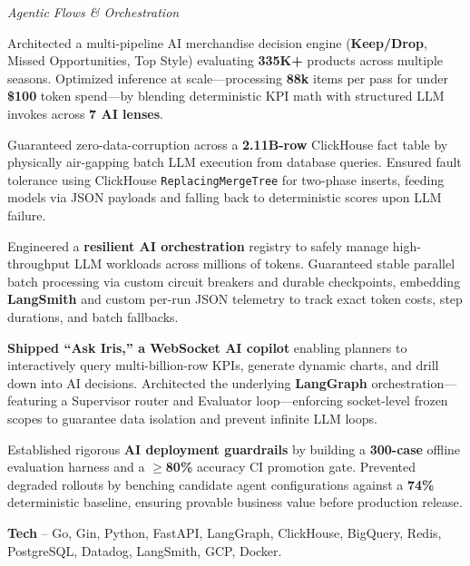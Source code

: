 \textcolor{Project}{\textit{Agentic Flows \& Orchestration}}
\vspace{-0.65ex}
\begin{zitemize}
    \item Architected a multi-pipeline AI merchandise decision engine (\textbf{Keep/Drop}, Missed Opportunities, Top Style) evaluating \textbf{335K+} products across multiple seasons. Optimized inference at scale---processing \textbf{88k} items per pass for under \textbf{\$100} token spend---by blending deterministic KPI math with structured LLM invokes across \textbf{7 AI lenses}.
    \item Guaranteed zero-data-corruption across a \textbf{2.11B-row} ClickHouse fact table by physically air-gapping batch LLM execution from database queries. Ensured fault tolerance using ClickHouse \texttt{ReplacingMergeTree} for two-phase inserts, feeding models via JSON payloads and falling back to deterministic scores upon LLM failure.
    \item Engineered a \textbf{resilient AI orchestration} registry to safely manage high-throughput LLM workloads across millions of tokens. Guaranteed stable parallel batch processing via custom circuit breakers and durable checkpoints, embedding \textbf{LangSmith} and custom per-run JSON telemetry to track exact token costs, step durations, and batch fallbacks.
    \item \textbf{Shipped ``Ask Iris,'' a WebSocket AI copilot} enabling planners to interactively query multi-billion-row KPIs, generate dynamic charts, and drill down into AI decisions. Architected the underlying \textbf{LangGraph} orchestration---featuring a Supervisor router and Evaluator loop---enforcing socket-level frozen scopes to guarantee data isolation and prevent infinite LLM loops.
    \item Established rigorous \textbf{AI deployment guardrails} by building a \textbf{300-case} offline evaluation harness and a $\geq$\textbf{80\%} accuracy CI promotion gate. Prevented degraded rollouts by benching candidate agent configurations against a \textbf{74\%} deterministic baseline, ensuring provable business value before production release.
    \item \textbf{Tech} -- Go, Gin, Python, FastAPI, LangGraph, ClickHouse, BigQuery, Redis, PostgreSQL, Datadog, LangSmith, GCP, Docker.
\end{zitemize}
